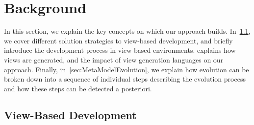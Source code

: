 \section{Background}
\label{sec:Background}


In this section, we explain the key concepts on which our approach builds.
In~\cref{sec:ViewBasedDevelopment}, we cover different solution strategies to view-based development, and briefly introduce the development process in view-based environments.
 explains how views are generated, and the impact of view generation languages on our approach.
Finally, in~\cref{sec:MetaModelEvolution}, we explain how \metamodel evolution can be broken down into a sequence of individual steps describing the evolution process and how these steps can be detected a posteriori.


\subsection{View-Based Development}
\label{sec:ViewBasedDevelopment}


